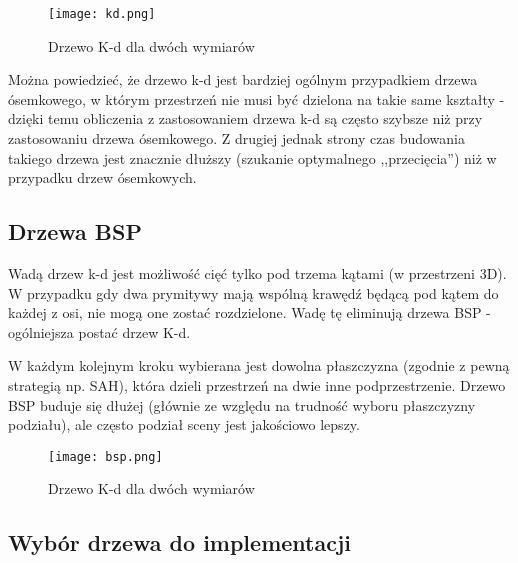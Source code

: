 \begin{figure}[h!]
\centering
  \caption{Drzewo K-d dla dwóch wymiarów}
  \texttt{[image: kd.png]}
\end{figure}

Można powiedzieć, że drzewo k-d jest bardziej ogólnym przypadkiem drzewa ósemkowego, w którym przestrzeń nie musi być dzielona na takie same kształty - dzięki temu obliczenia z zastosowaniem drzewa k-d są często szybsze niż przy zastosowaniu drzewa ósemkowego. Z drugiej jednak strony czas budowania takiego drzewa jest znacznie dłuższy (szukanie optymalnego ,,przecięcia'') niż w przypadku drzew ósemkowych.


\subsection{Drzewa BSP}

Wadą drzew k-d jest możliwość cięć tylko pod trzema kątami (w przestrzeni 3D). W przypadku gdy dwa prymitywy mają wspólną krawędź będącą pod kątem do każdej z osi, nie mogą one zostać rozdzielone. Wadę tę eliminują drzewa BSP - ogólniejsza postać drzew K-d.

W każdym kolejnym kroku wybierana jest dowolna płaszczyzna (zgodnie z pewną strategią np. SAH), która dzieli przestrzeń na dwie inne podprzestrzenie. Drzewo BSP buduje się dłużej (głównie ze względu na trudność wyboru płaszczyzny podziału), ale często podział sceny jest jakościowo lepszy.


\begin{figure}[h!]
\centering
  \caption{Drzewo K-d dla dwóch wymiarów}
  \texttt{[image: bsp.png]}
\end{figure}


\subsection{Wybór drzewa do implementacji}

